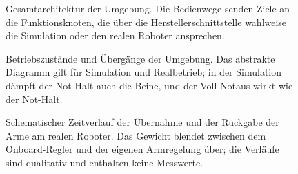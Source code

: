 
\begin{figure}[htbp]
  \centering
  
  \caption[Gesamtarchitektur der Umgebung]{Gesamtarchitektur der Umgebung. Die Bedienwege senden Ziele an die Funktionsknoten, die über die Herstellerschnittstelle wahlweise die Simulation oder den realen Roboter ansprechen.}
  \label{fig:architektur}
\end{figure}

\begin{figure}[htbp]
  \centering
  
  \caption[Betriebszustände und Übergänge]{Betriebszustände und Übergänge der Umgebung. Das abstrakte Diagramm gilt für Simulation und Realbetrieb; in der Simulation dämpft der Not-Halt auch die Beine, und der Voll-Notaus wirkt wie der Not-Halt.}
  \label{fig:betriebszustaende}
\end{figure}

\begin{figure}[htbp]
  \centering
  
  \caption[Übernahme und Rückgabe der Arme]{Schematischer Zeitverlauf der Übernahme und der Rückgabe der Arme am realen Roboter. Das Gewicht blendet zwischen dem Onboard-Regler und der eigenen Armregelung über; die Verläufe sind qualitativ und enthalten keine Messwerte.}
  \label{fig:armuebergabe}
\end{figure}

